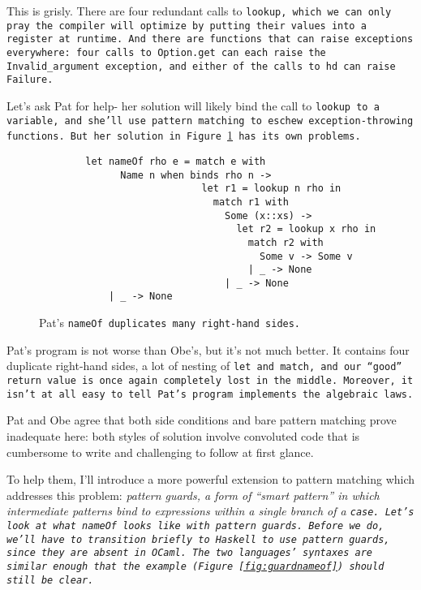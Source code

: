 \documentclass[manuscript,screen,review, 12pt]{acmart}
\begin{document}
\begin{outline}[enumerate]
    This is grisly. There are four redundant calls to \tt{lookup}, which we can
    only pray the compiler will optimize by putting their values into a register
    at runtime. And there are functions that can raise exceptions everywhere:
    four calls to \tt{Option.get} can each raise the \tt{Invalid\_argument}
    exception, and either of the calls to \tt{hd} can raise \tt{Failure}. 

    Let's ask Pat for help- her solution will likely bind the call to
    \tt{lookup} to a variable, and she'll use pattern matching to eschew
    exception-throwing functions. But her solution in Figure~\ref{fig:patnameof} has
    its own problems. 

    \begin{figure}[ht]
        \begin{verbatim}
        let nameOf rho e = match e with     
              Name n when binds rho n -> 
                            let r1 = lookup n rho in 
                              match r1 with 
                                Some (x::xs) -> 
                                  let r2 = lookup x rho in 
                                    match r2 with 
                                      Some v -> Some v   
                                    | _ -> None
                                | _ -> None
            | _ -> None 
            \end{verbatim}
        \caption{Pat's \tt{nameOf} duplicates many right-hand sides.}
        \label{fig:patnameof}
    \end{figure}

    Pat's program is not worse than Obe's, but it's not much better. It contains
    four duplicate right-hand sides, a lot of nesting of \tt{let} and
    \tt{match}, and our “good” return value is once again completely lost in the
    middle. Moreover, it isn't at all easy to tell Pat's program implements the
    algebraic laws.
    
    Pat and Obe agree that both side conditions and bare pattern matching prove
    inadequate here: both styles of solution involve convoluted code that is
    cumbersome to write and challenging to follow at first glance. 
    
    To help them, I'll introduce a more powerful extension to pattern matching
    which addresses this problem: \it{pattern guards}, a form of “smart pattern”
    in which intermediate patterns bind to expressions within a single branch of
    a \tt{case}. Let's look at what \tt{nameOf} looks like with pattern guards.
    Before we do, we'll have to transition briefly to Haskell to use pattern
    guards, since they are absent in OCaml. The two languages' syntaxes are
    similar enough that the example (Figure~\ref{fig:guardnameof}) should still
    be clear. 


\end{outline}
\end{document}
